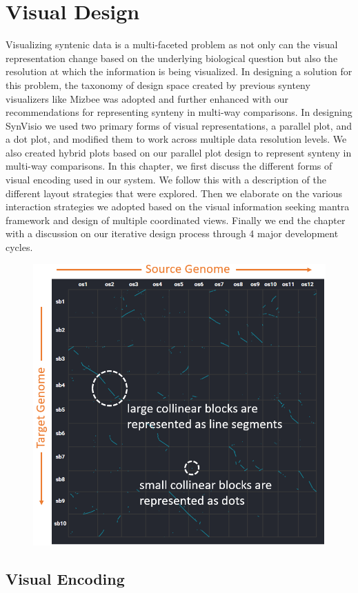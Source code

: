 \chapter{Visual Design}

Visualizing syntenic data is a multi-faceted problem as not only can the visual representation change based on the underlying biological question but also the resolution at which the information is being visualized. In designing a solution for this problem, the taxonomy of design space created by previous synteny visualizers like Mizbee \cite{Meyer2009} was adopted and further enhanced with our recommendations for representing synteny in multi-way comparisons. In designing SynVisio we used two primary forms of visual representations, a parallel plot, and a dot plot, and modified them to work across multiple data resolution levels. We also created hybrid plots based on our parallel plot design to represent synteny in multi-way comparisons. In this chapter, we first discuss the different forms of visual encoding used in our system. We follow this with a  description of the different layout strategies that were explored. Then we elaborate on the various interaction strategies we adopted based on the visual information seeking mantra framework and design of multiple coordinated views. Finally we end the chapter with a discussion on our iterative design process through 4 major development cycles.

\begin{figure}[h]
  \centering
  \includegraphics[width=.475\linewidth]{images/ch_4_dot_plot_a.PNG}
  \label{fig:ch_4_dot_plot_a}
\end{figure}


\section{Visual Encoding}

